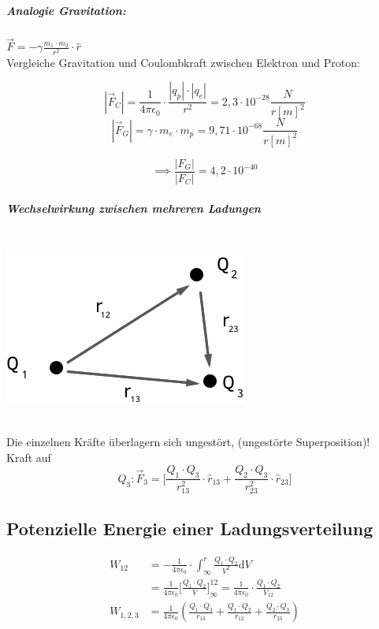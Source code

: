 \documentclass[11pt]{article}
\begin{document}
\hfill\\

\noindent{}

\subparagraph{Analogie Gravitation:} $\vec{F} = -\gamma\frac{m_1\cdot m_2}{r^2}\cdot\hat r$\\

Vergleiche Gravitation und Coulombkraft zwischen Elektron und Proton:

$$ |\vec{F}_C| = \frac{1}{4\pi\epsilon_0}\cdot\frac{|q_p|\cdot|q_e|}{r^2}= 2,3\cdot10^{ -28 } \frac{N}{r[m]^2} $$
$$ |\vec{F}_G|= \gamma\cdot m_e\cdot m_p  = 9,71\cdot10^{-68} \frac{N}{r[m]^2}$$

$$ \implies \frac{|F_G|}{|F_C|} = 4,2\cdot10^{-40} $$

\subparagraph{Wechselwirkung zwischen mehreren Ladungen}

\hfill\\

\includegraphics{skizzen/14/14_2B1}

\hfill\\

Die einzelnen Kräfte überlagern sich ungestört, (ungestörte Superposition)!\\

Kraft auf $$ Q_3: \vec{F}_3 = \bigg[\frac{Q_1\cdot Q_3}{r^2_{13}}\cdot\hat{r}_{13}+\frac{Q_2\cdot Q_3}{r^2_{23}}\cdot\hat{r}_{23}\bigg]$$ 


\subsection{Potenzielle Energie einer Ladungsverteilung}


\begin{align*}
\displaystyle W_{12} &= -\frac{1}{4\pi\epsilon_0}\cdot\int_{\infty}^{r} \frac{Q_1\cdot Q_2}{V^2}  \mathrm{d}V\\
&=\frac{1}{4\pi\epsilon_0} \big[\frac{Q_1\cdot Q_2}{V}\big]^{12}_\infty = \frac{1}{4\pi\epsilon_0}\cdot \frac{Q_1\cdot Q_2}{V_{12}}\\
W_{1,2,3} &= \frac{1}{4\pi\epsilon_0}(\frac{Q_1\cdot Q_3}{r_{13}}+\frac{Q_1\cdot Q_2}{r_{12}}+\frac{Q_2\cdot Q_3}{r_{23}})
\end{align*}\\
\end{document}

